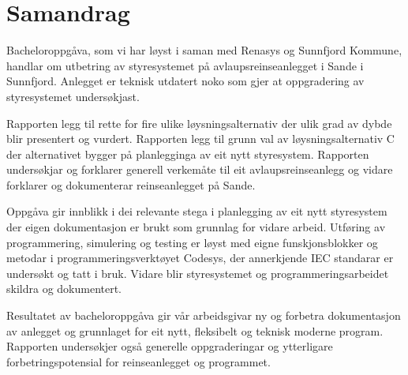 \chapter{Samandrag}
\thispagestyle{romanpages}

Bacheloroppgåva, som vi har løyst i saman med \gls{Renasys} og \gls{Sunnfjord Kommune}, handlar om utbetring av styresystemet på 
avlaupsreinseanlegget i Sande i Sunnfjord. 
Anlegget er teknisk utdatert noko som gjer at oppgradering av styresystemet undersøkjast.

Rapporten legg til rette for fire ulike løysningsalternativ
der ulik grad av dybde blir presentert og vurdert. \newline
Rapporten legg til grunn val av løysningsalternativ C der alternativet bygger på planlegginga av eit nytt styresystem.
Rapporten undersøkjar og forklarer generell verkemåte til eit avlaupsreinseanlegg og 
vidare forklarer og dokumenterar reinseanlegget på Sande.

Oppgåva gir innblikk i dei relevante stega i planlegging av eit nytt styresystem der eigen dokumentasjon er brukt som grunnlag for vidare arbeid. 
Utføring av programmering, simulering og testing er løyst med eigne funskjonsblokker og metodar i programmeringsverktøyet \gls{Codesys},
der annerkjende \gls{IEC} standarar er undersøkt og tatt i bruk.
Vidare blir styresystemet og programmeringsarbeidet skildra og dokumentert.

Resultatet av bacheloroppgåva gir vår arbeidsgivar ny og forbetra dokumentasjon av anlegget 
og grunnlaget for eit nytt, fleksibelt og teknisk moderne program. 
Rapporten undersøkjer også generelle oppgraderingar og ytterligare forbetringspotensial 
for reinseanlegget og programmet.